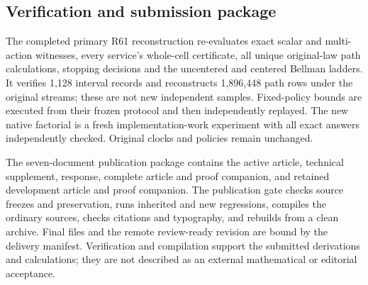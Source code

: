 \documentclass[ecta,nameyear,draft]{econsocart}
\begin{document}
\hypertarget{verification-and-submission-package}{%
\subsection{Verification and submission
package}\label{verification-and-submission-package}}

The completed primary R61 reconstruction re-evaluates exact scalar and
multi-action witnesses, every service's whole-cell certificate, all
unique original-law path calculations, stopping decisions and the
uncentered and centered Bellman ladders. It verifies 1,128 interval
records and reconstructs 1,896,448 path rows under the original streams;
these are not new independent samples. Fixed-policy bounds are executed
from their frozen protocol and then independently replayed. The new
native factorial is a fresh implementation-work experiment with all
exact answers independently checked. Original clocks and policies remain
unchanged.

The seven-document publication package contains the active article,
technical supplement, response, complete article and proof companion,
and retained development article and proof companion. The publication
gate checks source freezes and preservation, runs inherited and new
regressions, compiles the ordinary sources, checks citations and
typography, and rebuilds from a clean archive. Final files and the
remote review-ready revision are bound by the delivery manifest.
Verification and compilation support the submitted derivations and
calculations; they are not described as an external mathematical or
editorial acceptance.
\end{document}
